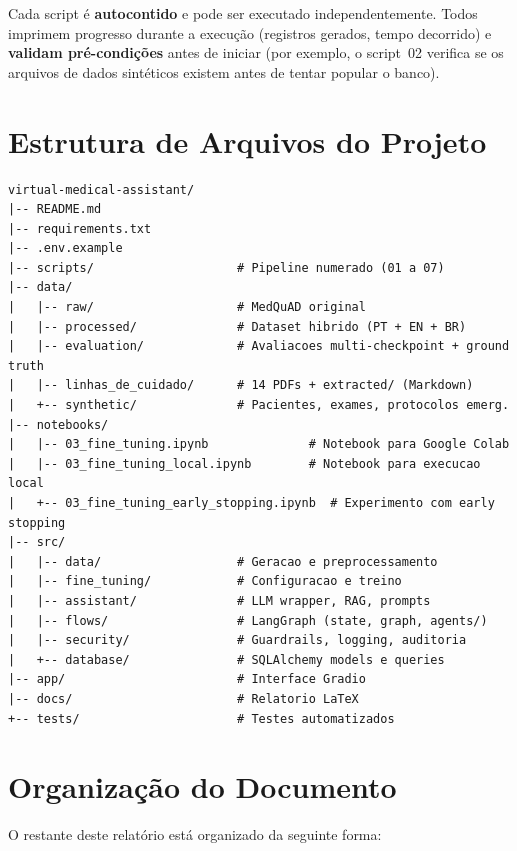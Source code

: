 \begin{infobox}
Cada script é \textbf{autocontido} e pode ser executado independentemente. Todos imprimem progresso durante a execução (registros gerados, tempo decorrido) e \textbf{validam pré-condições} antes de iniciar (por exemplo, o script~02 verifica se os arquivos de dados sintéticos existem antes de tentar popular o banco).
\end{infobox}

\section{Estrutura de Arquivos do Projeto}

\begin{lstlisting}[style=bash, caption={Estrutura de diretórios do projeto.}, label=lst:estrutura]
virtual-medical-assistant/
|-- README.md
|-- requirements.txt
|-- .env.example
|-- scripts/                    # Pipeline numerado (01 a 07)
|-- data/
|   |-- raw/                    # MedQuAD original
|   |-- processed/              # Dataset hibrido (PT + EN + BR)
|   |-- evaluation/             # Avaliacoes multi-checkpoint + ground truth
|   |-- linhas_de_cuidado/      # 14 PDFs + extracted/ (Markdown)
|   +-- synthetic/              # Pacientes, exames, protocolos emerg.
|-- notebooks/
|   |-- 03_fine_tuning.ipynb              # Notebook para Google Colab
|   |-- 03_fine_tuning_local.ipynb        # Notebook para execucao local
|   +-- 03_fine_tuning_early_stopping.ipynb  # Experimento com early stopping
|-- src/
|   |-- data/                   # Geracao e preprocessamento
|   |-- fine_tuning/            # Configuracao e treino
|   |-- assistant/              # LLM wrapper, RAG, prompts
|   |-- flows/                  # LangGraph (state, graph, agents/)
|   |-- security/               # Guardrails, logging, auditoria
|   +-- database/               # SQLAlchemy models e queries
|-- app/                        # Interface Gradio
|-- docs/                       # Relatorio LaTeX
+-- tests/                      # Testes automatizados
\end{lstlisting}

\section{Organização do Documento}

O restante deste relatório está organizado da seguinte forma:

